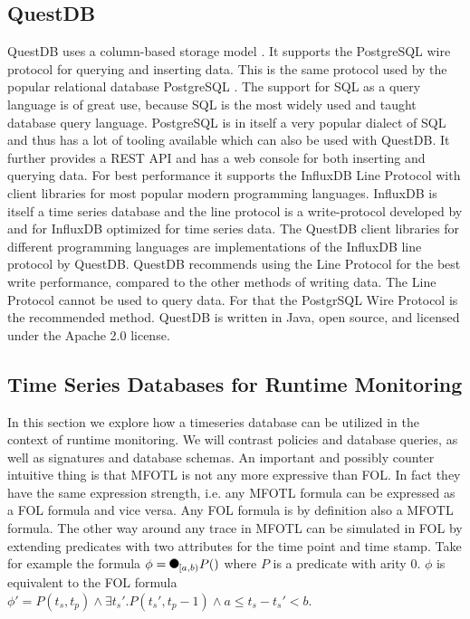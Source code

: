 \subsection{QuestDB}
QuestDB uses a column-based storage model \cite{questdb-storage-model}.
It supports the PostgreSQL wire protocol \cite{questdb-postgres-wire} for querying and inserting data.
This is the same protocol used by the popular relational database PostgreSQL \cite{postgres}.
The support for SQL as a query language is of great use, because SQL is the most widely used and taught database query language.
PostgreSQL is in itself a very popular dialect of SQL and thus has a lot of tooling available which can also be used with QuestDB.
It further provides a REST API \cite{questdb-rest} and has a web console for both inserting and querying data.
For best performance it supports the InfluxDB Line Protocol \cite{questdb-influx-db-line-protocol, influx-line} with client libraries for most popular modern programming languages.
InfluxDB is itself a time series database and the line protocol is a write-protocol developed by and for InfluxDB optimized for time series data.
The QuestDB client libraries for different programming languages are implementations of the InfluxDB line protocol by QuestDB.
QuestDB recommends using the Line Protocol for the best write performance, compared to the other methods of writing data.
The Line Protocol cannot be used to query data.
For that the PostgrSQL Wire Protocol is the recommended method.
QuestDB is written in Java, open source, and licensed under the Apache 2.0 license.

\subsection{Time Series Databases for Runtime Monitoring}
In this section we explore how a timeseries database can be utilized in the context of runtime monitoring.
We will contrast policies and database queries, as well as signatures and database schemas.
An important and possibly counter intuitive thing is that MFOTL is not any more expressive than FOL.
In fact they have the same expression strength, i.e. any MFOTL formula can be expressed as a FOL formula and vice versa.
Any FOL formula is by definition also a MFOTL formula.
The other way around any trace in MFOTL can be simulated in FOL by extending predicates with two attributes for the time point and time stamp.
Take for example the formula $\phi = \Previous{[a,b)} P()$ where $P$ is a predicate with arity $0$.
$\phi$ is equivalent to the FOL formula $\phi' = P(t_s, t_p) \land \exists t_s' . P(t_s', t_p - 1) \land a \leq t_s - t_s' < b$.

